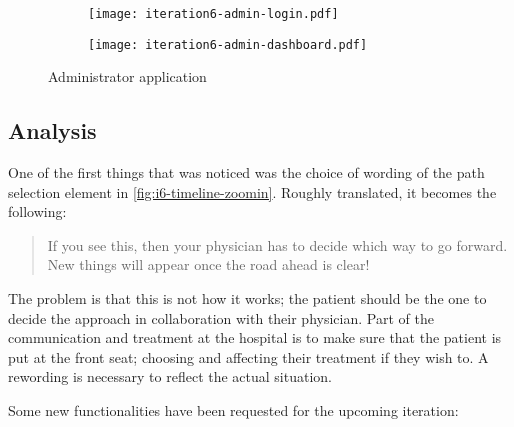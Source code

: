 \begin{figure}
    \centering
    \begin{subfigure}[t]{0.9\textwidth}
        \centering
        \vspace{0pt}
        \texttt{[image: iteration6-admin-login.pdf]}
        \label{fig:i6-admin-login}
    \end{subfigure}

    \vspace{50pt}

    \begin{subfigure}[t]{0.9\textwidth}
        \centering
        \vspace{0pt}
        \texttt{[image: iteration6-admin-dashboard.pdf]}
        \label{fig:i6-admin-dashboard}
    \end{subfigure}
    \caption{Administrator application}
    \label{fig:i6-admin}
\end{figure}

\subsection{Analysis}

One of the first things that was noticed was the choice of wording of the path selection element in \autoref{fig:i6-timeline-zoomin}. Roughly translated, it becomes the following:

\begin{quote}
    If you see this, then your physician has to decide which way to go forward. New things will appear once the road ahead is clear!
\end{quote}

The problem is that this is not how it works; the patient should be the one to decide the approach in collaboration with their physician. Part of the communication and treatment at the hospital is to make sure that the patient is put at the front seat; choosing and affecting their treatment if they wish to. A rewording is necessary to reflect the actual situation.

Some new functionalities have been requested for the upcoming iteration:

